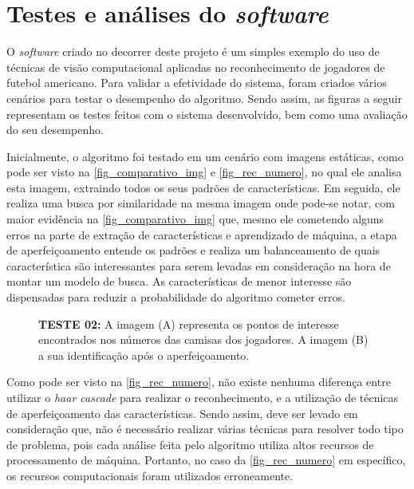 \section{\textbf{Testes e análises do \textit{software}}}
\label{testes_do_software}
O \textit{software} criado no decorrer deste projeto é um simples exemplo do uso de técnicas de visão computacional aplicadas no reconhecimento de jogadores de futebol americano. Para validar a efetividade do sistema, foram criados vários cenários para testar o desempenho do algoritmo. Sendo assim, as figuras a seguir representam os testes feitos com o sistema desenvolvido, bem como uma avaliação do seu desempenho.

Inicialmente, o algoritmo foi testado em um cenário com imagens estáticas, como pode ser visto na \autoref{fig_comparativo_img} e \autoref{fig_rec_numero}, no qual ele analisa esta imagem, extraindo todos os seus padrões de características. Em seguida, ele realiza uma busca por similaridade na mesma imagem onde pode-se notar, com maior evidência na  \autoref{fig_comparativo_img} que, mesmo ele cometendo alguns erros na parte de extração de características e aprendizado de máquina, a etapa de aperfeiçoamento entende os padrões e realiza um balanceamento de quais característica são interessantes para serem levadas em consideração na hora de montar um modelo de busca. As características de menor interesse são dispensadas para reduzir a probabilidade do algoritmo cometer erros.

\begin{figure}[ht]
	\caption{\label{fig_rec_numero}\textbf{TESTE 02:} A imagem (A) representa os pontos de interesse encontrados nos números das camisas dos jogadores. A imagem (B) a sua identificação após o aperfeiçoamento.}
	\begin{center}
	\end{center}
	\centering {}
\end{figure}

Como pode ser visto na \autoref{fig_rec_numero}, não existe nenhuma diferença entre utilizar o \textit{haar cascade} para realizar o reconhecimento, e a utilização de técnicas de aperfeiçoamento das características. Sendo assim, deve ser levado em consideração que, não é necessário realizar várias técnicas para resolver todo tipo de problema, pois cada análise feita pelo algoritmo utiliza altos recursos de processamento de máquina. Portanto, no caso da \autoref{fig_rec_numero} em específico, os recursos computacionais foram utilizados erroneamente.

